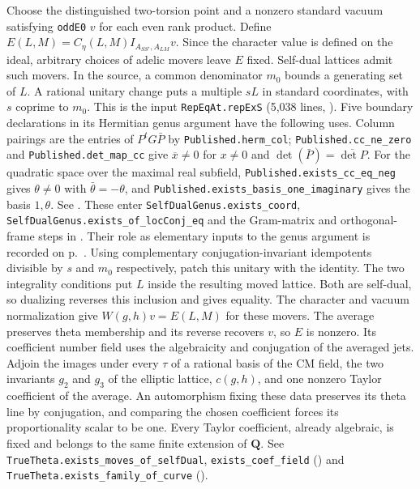 Choose the distinguished two-torsion point and a nonzero standard vacuum satisfying \nolinkurl{oddE0}
$v$ for each even rank product. Define
$E(L,M)=C_\eta(L,M)I_{A_{SS'},A_{LM}}v$. Since the character value is
defined on the ideal, arbitrary choices of adelic movers leave $E$ fixed.
Self-dual lattices admit such movers. In the source, a common denominator
$m_0$ bounds a generating set of $L$. A rational unitary change puts
a multiple $sL$ in standard coordinates, with $s$ coprime to $m_0$.
This is the input \nolinkurl{RepEqAt.repExS} (5,038 lines,
). Five boundary declarations in its
Hermitian genus argument have the following uses. Column pairings are
the entries of $P^tG\bar P$ by \nolinkurl{Published.herm_col};
\nolinkurl{Published.cc_ne_zero} and \nolinkurl{Published.det_map_cc}
give $\overline{x}\ne0$ for $x\ne0$ and
$\det(\bar P)=\overline{\det P}$. For the quadratic space over the
maximal real subfield, \nolinkurl{Published.exists_cc_eq_neg} gives
$\theta\ne0$ with $\bar\theta=-\theta$, and
\nolinkurl{Published.exists_basis_one_imaginary} gives the basis
$1,\theta$. See .
These enter \nolinkurl{SelfDualGenus.exists_coord},
\nolinkurl{SelfDualGenus.exists_of_locConj_eq} and the Gram-matrix and
orthogonal-frame steps in .
Their role as elementary inputs to the genus argument is recorded on
p.~\pageref{r15:hasse-comparison}.
Using complementary conjugation-invariant idempotents divisible by $s$
and $m_0$ respectively, patch this unitary with the identity. The two
integrality conditions put $L$ inside the resulting moved lattice.
Both are self-dual, so dualizing reverses this inclusion and gives
equality. The character and vacuum normalization give
$W(g,h)v=E(L,M)$ for these movers. The average preserves theta membership
and its reverse recovers $v$, so $E$ is nonzero. Its coefficient number field
uses the algebraicity and conjugation of the averaged jets. Adjoin the
images under every $\tau$ of a rational basis of the CM field, the two
invariants $g_2$ and $g_3$ of the elliptic lattice,
$c(g,h)$, and one nonzero Taylor coefficient of the average. An automorphism
fixing these data preserves its theta line by conjugation, and comparing
the chosen coefficient forces its proportionality scalar to be one.
Every Taylor coefficient, already algebraic, is fixed and belongs to the
same finite extension of $\mathbf Q$. See \nolinkurl{TrueTheta.exists_moves_of_selfDual},
\nolinkurl{exists_coef_field}
() and
\nolinkurl{TrueTheta.exists_family_of_curve}
().

